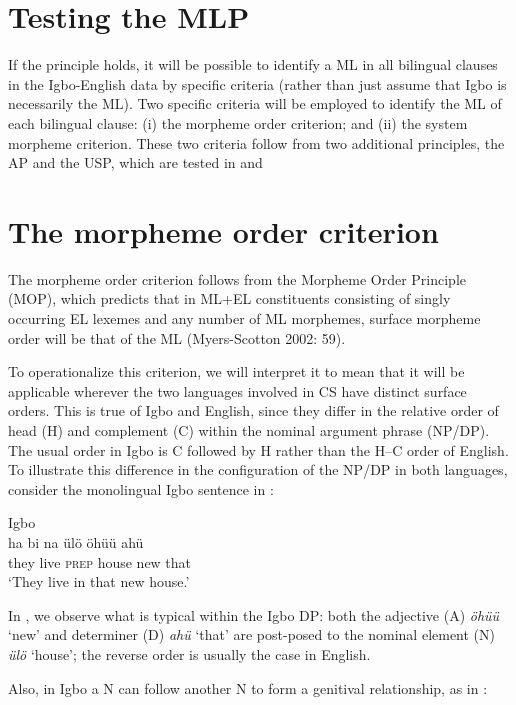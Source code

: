 \documentclass[output=paper]{langsci/langscibook}
\begin{document}
\section{Testing the MLP }

If the principle holds, it will be possible to identify a ML in all bilingual clauses in the Igbo-English data by specific criteria (rather than just assume that Igbo is necessarily the ML). Two specific criteria will be employed to identify the ML of each bilingual clause: (i) the morpheme order criterion; and (ii) the system morpheme criterion. These two criteria follow from two additional principles, the AP and the USP, which are tested in  and 

\section{The morpheme order criterion}

The morpheme order criterion follows from the Morpheme Order Principle (MOP), which predicts that in ML+EL constituents consisting of singly occurring EL lexemes and any number of ML morphemes, surface morpheme order will be that of the ML (Myers-Scotton 2002: 59). 

To operationalize this criterion, we will interpret it to mean that it will be applicable wherever the two languages involved in CS have distinct surface orders. This is true of Igbo and English, since they differ in the relative order of head (H) and complement (C) within the nominal argument phrase (NP/DP). The usual order in Igbo is C followed by H rather than the H–C order of English. To illustrate this difference in the configuration of the NP/DP in both languages, consider the monolingual Igbo sentence in :

\ea
{Igbo}\\
\gll ha    bi  na   ülö  öhüü  ahü\\
     they  live  \textsc{prep}  house  new  that\\
\glt ‘They live in that new house.’
\z

In , we observe what is typical within the Igbo DP: both the adjective (A) \textit{öhüü} ‘new’ and determiner (D) \textit{ahü} ‘that’ are post-posed to the nominal element (N) \textit{ülö }‘house’; the reverse order is usually the case in English. 

Also, in Igbo a N can follow another N to form a genitival relationship, as in : 
\end{document}
